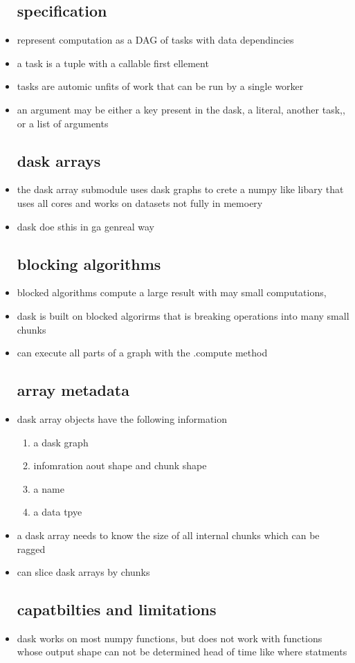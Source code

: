 \documentclass{article}
\begin{document}
\begin{itemize}
\subsection*{specification }
\item represent computation as a DAG of tasks with data dependincies 
\item a task is a tuple with  a callable first ellement 
\item tasks are automic unfits of work that can be run by a single worker
\item an argument may be either a key present in the dask, a literal, another task,, or a list of arguments
\subsection*{dask arrays}
\item the dask array submodule uses dask graphs to crete a numpy like libary that uses all cores and works on datasets not fully in memoery 
\item dask doe sthis in ga genreal way 
\subsection*{blocking algorithms}
\item blocked algorithms compute a large result with may small computations, 
\item dask is built on blocked algorirms that is breaking operations into many small chunks 
\item can execute all parts of a graph with the .compute method 
\subsection*{array metadata }
\item dask array objects have the following information
\begin{enumerate}
    \item a dask graph 
    \item infomration aout shape and chunk shape 
    \item a name 
    \item a data tpye 
\end{enumerate}
\item a dask array needs to know the size of all internal chunks which can be ragged
\item can slice dask arrays by chunks 
\subsection*{capatbilties and limitations}
\item dask works on most numpy functions, but does not work with functions whose output shape can not be determined head of time like where statments 

\end{itemize}
\end{document}
